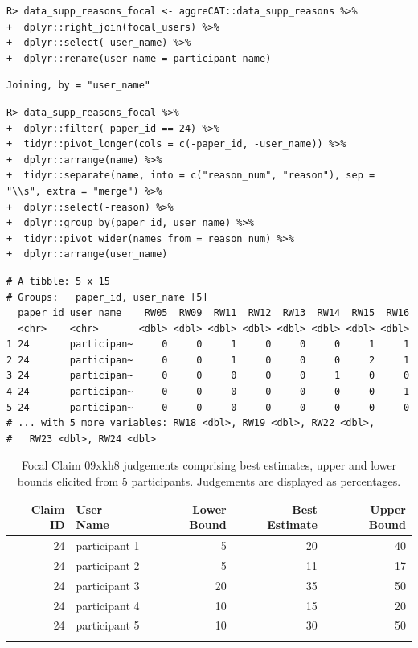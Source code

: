 \documentclass[article]{jss}
\begin{document}
\begin{verbatim}
R> data_supp_reasons_focal <- aggreCAT::data_supp_reasons %>%  
+  dplyr::right_join(focal_users) %>% 
+  dplyr::select(-user_name) %>% 
+  dplyr::rename(user_name = participant_name)
\end{verbatim}

\begin{verbatim}
Joining, by = "user_name"
\end{verbatim}

\begin{verbatim}
R> data_supp_reasons_focal %>%
+  dplyr::filter( paper_id == 24) %>%
+  tidyr::pivot_longer(cols = c(-paper_id, -user_name)) %>%
+  dplyr::arrange(name) %>%
+  tidyr::separate(name, into = c("reason_num", "reason"), sep = "\\s", extra = "merge") %>%
+  dplyr::select(-reason) %>%
+  dplyr::group_by(paper_id, user_name) %>%
+  tidyr::pivot_wider(names_from = reason_num) %>%
+  dplyr::arrange(user_name)
\end{verbatim}

\begin{verbatim}
# A tibble: 5 x 15
# Groups:   paper_id, user_name [5]
  paper_id user_name    RW05  RW09  RW11  RW12  RW13  RW14  RW15  RW16
  <chr>    <chr>       <dbl> <dbl> <dbl> <dbl> <dbl> <dbl> <dbl> <dbl>
1 24       participan~     0     0     1     0     0     0     1     1
2 24       participan~     0     0     1     0     0     0     2     1
3 24       participan~     0     0     0     0     0     1     0     0
4 24       participan~     0     0     0     0     0     0     0     1
5 24       participan~     0     0     0     0     0     0     0     0
# ... with 5 more variables: RW18 <dbl>, RW19 <dbl>, RW22 <dbl>,
#   RW23 <dbl>, RW24 <dbl>
\end{verbatim}

\hypertarget{tbl-reason-wagg-focal-claim}{}
\begin{longtable}{rlrrr}

\toprule
Claim ID & User Name & Lower Bound & Best Estimate & Upper Bound \\ 
\midrule
24 & participant 1 & 5 & 20 & 40 \\ 
24 & participant 2 & 5 & 11 & 17 \\ 
24 & participant 3 & 20 & 35 & 50 \\ 
24 & participant 4 & 10 & 15 & 20 \\ 
24 & participant 5 & 10 & 30 & 50 \\ 
\bottomrule
\caption{\label{tbl-reason-wagg-focal-claim}Focal Claim 09xkh8 judgements comprising best estimates, upper and lower
bounds elicited from 5 participants. Judgements are displayed as
percentages. }\tabularnewline
\end{longtable}
\end{document}
